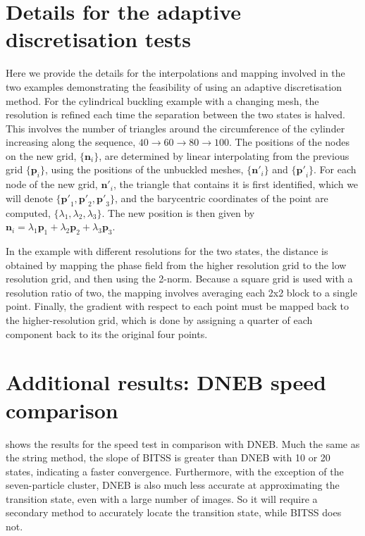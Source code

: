 \documentclass[aps,physrev,10pt]{revtex4-2}
\begin{document}
\section{Details for the adaptive discretisation tests}
Here we provide the details for the interpolations and mapping involved in the two examples demonstrating the feasibility of using an adaptive discretisation method.
For the cylindrical buckling example with a changing mesh, the resolution is refined each time the separation between the two states is halved. 
This involves the number of triangles around the circumference of the cylinder increasing along the sequence, $40 \rightarrow 60 \rightarrow 80 \rightarrow 100$.
The positions of the nodes on the new grid, $\{\bm{n}_i\}$, are determined by linear interpolating from the previous grid $\{\bm{p}_i\}$, using the positions of the unbuckled meshes, $\{\bm{n'}_i\}$ and $\{\bm{p'}_i\}$.
For each node of the new grid, $\bm{n'}_i$, the triangle that contains it is first identified, which we will denote $\{\bm{p'}_1,\bm{p'}_2,\bm{p'}_3\}$, and the barycentric coordinates of the point are computed, $\{\lambda_1,\lambda_2,\lambda_3\}$.
The new position is then given by $\bm{n}_i = \lambda_1 \bm{p}_1 + \lambda_2 \bm{p}_2 + \lambda_3 \bm{p}_3$.

In the example with different resolutions for the two states, the distance is obtained by mapping the phase field from the higher resolution grid to the low resolution grid, and then using the 2-norm.
Because a square grid is used with a resolution ratio of two, the mapping involves averaging each 2x2 block to a single point.
Finally, the gradient with respect to each point must be mapped back to the higher-resolution grid, which is done by assigning a quarter of each component back to its the original four points.


\section{Additional results: DNEB speed comparison}
 shows the results for the speed test in comparison with DNEB.
Much the same as the string method, the slope of BITSS is greater than DNEB with 10 or 20 states, indicating a faster convergence.
Furthermore, with the exception of the seven-particle cluster, DNEB is also much less accurate at approximating the transition state, even with a large number of images.
So it will require a secondary method to accurately locate the transition state, while BITSS does not.
\end{document}
